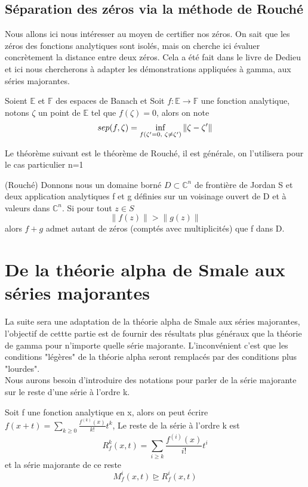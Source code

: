 \documentclass[a4paper,10.5pt]{article}
\begin{document}
	
	\subsection{Séparation des zéros via la méthode de Rouché}
	Nous allons ici nous intéresser au moyen de certifier nos zéros. On sait que les zéros des fonctions analytiques sont isolés, mais on cherche ici évaluer concrètement la distance entre deux zéros. Cela a été fait dans le livre de Dedieu et ici nous chercherons à adapter les démonstrations appliquées à gamma, aux séries majorantes.
	
	\begin{definition} Soient $\mathbb{E}$ et $\mathbb{F}$ des espaces de Banach et 
		Soit $f:\mathbb{E}\rightarrow \mathbb{F}$ une fonction analytique, notons $\zeta$ un point de $\mathbb{E}$ tel que $f(\zeta)=0$, alors on note
		\[sep(f,\zeta)=\inf_{f(\zeta '=0, \hspace{1mm} \zeta \neq \zeta ')}\left\|\zeta-\zeta '\right\|\] 
	\end{definition}
	
	Le théorème suivant est le théorème de Rouché, il est générale, on l'utilisera pour le cas particulier n=1

	\begin{theorem}(Rouché) Donnons nous un domaine borné $D \subset \mathbb{C}^{n}$ de frontière de Jordan S et deux application analytiques f et g définies sur un voisinage ouvert de D et à valeurs dans $\mathbb{C}^n$. Si pour tout $z \in S$ 
		\[\left\|f(z)\right\|>\left\|g(z)\right\|\]
	alors $f+g$ admet autant de zéros (comptés avec multiplicités) que f dans D.
	\end{theorem}
	
	
	\section{De la théorie alpha de Smale aux séries majorantes}
	
	La suite sera une adaptation de la théorie alpha de Smale aux séries majorantes, l'objectif de cettte partie est de fournir des résultats plus généraux que la théorie de gamma pour n'importe quelle série majorante. L'inconvénient c'est que les conditions "légères" de la théorie alpha seront remplacés par des conditions plus "lourdes". \\
	Nous aurons besoin d'introduire des notations pour parler de la série majorante sur le reste d'une série à l'ordre k.
	
	\begin{definition} Soit f une fonction analytique en x, alors on peut écrire $f(x+t)=\sum_{k \geq 0} \frac{f^{(k)}(x)}{k!}t^{k}$, Le reste de la série à l'ordre k est 
	\[R_{f}^{k}(x,t)=\sum_{i \geq k} \frac{f^{(i)}(x)}{i!}t^{i}\]
	et la série majorante de ce reste
	\[M_{f}^{i}(x,t) \unrhd R_{f}^{i}(x,t)\]
	\end{definition}
	
\end{document}
